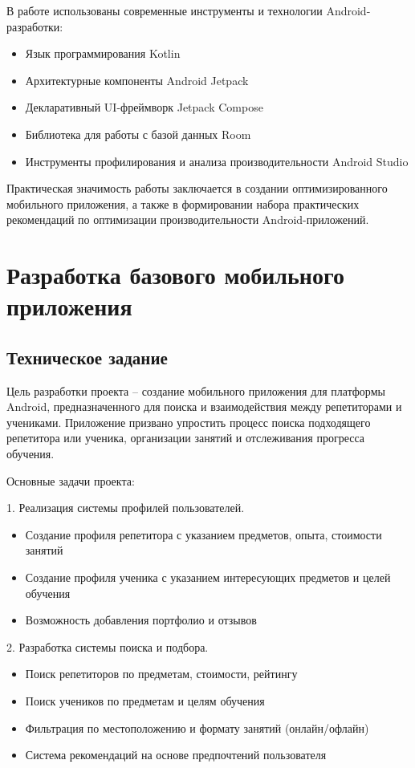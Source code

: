 \documentclass[14pt, russian]{scrartcl}
\begin{document}
В работе использованы современные инструменты и технологии Android-разработки:
\begin{itemize}
\item Язык программирования Kotlin
\item Архитектурные компоненты Android Jetpack
\item Декларативный UI-фреймворк Jetpack Compose
\item Библиотека для работы с базой данных Room
\item Инструменты профилирования и анализа производительности Android Studio
\end{itemize}

Практическая значимость работы заключается в создании оптимизированного мобильного приложения, а также в формировании набора практических рекомендаций по оптимизации производительности Android-приложений.

\section{Разработка базового мобильного приложения}\label{sect:development}

\subsection{Техническое задание}\label{sect:requirements}

Цель разработки проекта – создание мобильного приложения для платформы Android, предназначенного для поиска и взаимодействия между репетиторами и учениками. Приложение призвано упростить процесс поиска подходящего репетитора или ученика, организации занятий и отслеживания прогресса обучения.

Основные задачи проекта:

1. Реализация системы профилей пользователей.
   \begin{itemize}
   \item Создание профиля репетитора с указанием предметов, опыта, стоимости занятий
   \item Создание профиля ученика с указанием интересующих предметов и целей обучения
   \item Возможность добавления портфолио и отзывов
   \end{itemize}

2. Разработка системы поиска и подбора.
   \begin{itemize}
   \item Поиск репетиторов по предметам, стоимости, рейтингу
   \item Поиск учеников по предметам и целям обучения
   \item Фильтрация по местоположению и формату занятий (онлайн/офлайн)
   \item Система рекомендаций на основе предпочтений пользователя
   \end{itemize}
\end{document}
